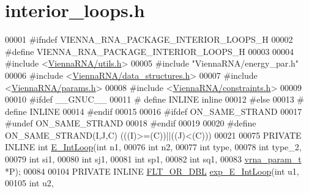 \hypertarget{interior__loops_8h_source}{}\section{interior\+\_\+loops.\+h}
\label{interior__loops_8h_source}

\begin{DoxyCode}
00001 \textcolor{preprocessor}{#ifndef VIENNA\_RNA\_PACKAGE\_INTERIOR\_LOOPS\_H}
00002 \textcolor{preprocessor}{#define VIENNA\_RNA\_PACKAGE\_INTERIOR\_LOOPS\_H}
00003 
00004 \textcolor{preprocessor}{#include <\hyperlink{utils_8h}{ViennaRNA/utils.h}>}
00005 \textcolor{preprocessor}{#include "ViennaRNA/energy\_par.h"}
00006 \textcolor{preprocessor}{#include <\hyperlink{data__structures_8h}{ViennaRNA/data\_structures.h}>}
00007 \textcolor{preprocessor}{#include <\hyperlink{params_8h}{ViennaRNA/params.h}>}
00008 \textcolor{preprocessor}{#include <\hyperlink{constraints_8h}{ViennaRNA/constraints.h}>}
00009 
00010 \textcolor{preprocessor}{#ifdef \_\_GNUC\_\_}
00011 \textcolor{preprocessor}{# define INLINE inline}
00012 \textcolor{preprocessor}{#else}
00013 \textcolor{preprocessor}{# define INLINE}
00014 \textcolor{preprocessor}{#endif}
00015 
00016 \textcolor{preprocessor}{#ifdef ON\_SAME\_STRAND}
00017 \textcolor{preprocessor}{#undef ON\_SAME\_STRAND}
00018 \textcolor{preprocessor}{#endif}
00019 
00020 \textcolor{preprocessor}{#define ON\_SAME\_STRAND(I,J,C)  (((I)>=(C))||((J)<(C)))}
00021 
00075 PRIVATE INLINE \textcolor{keywordtype}{int} \hyperlink{group__loops_ga0266d2c7a6098259280fb97e9f980b34}{E\_IntLoop}(\textcolor{keywordtype}{int} n1,
00076                               \textcolor{keywordtype}{int} n2,
00077                               \textcolor{keywordtype}{int} type,
00078                               \textcolor{keywordtype}{int} type\_2,
00079                               \textcolor{keywordtype}{int} si1,
00080                               \textcolor{keywordtype}{int} sj1,
00081                               \textcolor{keywordtype}{int} sp1,
00082                               \textcolor{keywordtype}{int} sq1,
00083                               \hyperlink{group__energy__parameters_structvrna__param__s}{vrna\_param\_t} *P);
00084 
00104 PRIVATE INLINE \hyperlink{group__data__structures_ga31125aeace516926bf7f251f759b6126}{FLT\_OR\_DBL} \hyperlink{group__loops_ga34e8abb9e1b54fab38524fb20214a43e}{exp\_E\_IntLoop}(\textcolor{keywordtype}{int} u1,
00105                                         \textcolor{keywordtype}{int} u2,

\end{DoxyCode}
